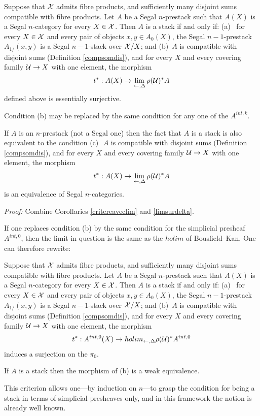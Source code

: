 \begin{proposition}
\label{critere7}
Suppose that ${\cal X}$ admits fibre products, and sufficiently many
\linebreak
disjoint sums compatible with fibre products. Let $A$ be a
Segal $n$-prestack
such that $A(X)$ is a Segal $n$-category for every $X\in {\cal X}$.
Then $A$ is a stack if and only if:
\newline
(a) \,  for every $X\in {\cal X}$ and every pair of objects $x,y\in A_0(X)$, the
Segal $n-1$-prestack $A_{1/}(x,y)$ is a Segal $n-1$-stack over
${\cal X} /X$;
and
\newline
(b)\, $A$ is compatible with disjoint sums (Definition
\ref{compsomdis}), and for every $X$ and every covering family ${\cal U} \rightarrow
X$ with one element, the morphism
$$
t^{\ast} : A(X) \rightarrow \lim _{\leftarrow , \Delta} \rho ({\cal U} )^{\ast }A
$$
defined above is essentially surjective.

Condition (b) may be
replaced by the same condition for any one of the
$A^{int, k}$.

If $A$ is an $n$-prestack (not a Segal one) then
the fact that $A$ is a stack is also equivalent to the condition
\newline
(c)\,\,  $A$ is compatible with disjoint sums (Definition
\ref{compsomdis}), and for every $X$ and every covering family ${\cal U}
\rightarrow
X$ with one element, the
morphism
$$
t^{\ast} : A(X) \rightarrow \lim _{\leftarrow , \Delta} \rho ({\cal U} )^{\ast }A
$$
is an equivalence of Segal $n$-categories.
\end{proposition}
{\em Proof:}
Combine Corollaries \ref{critereaveclim} and \ref{limsurdelta}.
\eop

If one replaces condition (b) by the same condition for the simplicial
presheaf $A^{int, 0}$, then the limit
in question is the same as the $holim$ of Bousfield--Kan. One
can therefore rewrite:
\begin{corollary}
Suppose that ${\cal X}$ admits fibre products, and sufficiently many disjoint sums
compatible with fibre products. Let $A$ be a Segal $n$-prestack such that
$A(X)$ is a Segal $n$-category
for every $X\in {\cal X}$. Then $A$ is a stack if and only if:
\newline
(a) \,  for every $X\in {\cal X}$ and every pair of objects $x,y\in A_0(X)$, the
Segal $n-1$-prestack $A_{1/}(x,y)$ is a Segal $n-1$-stack over
${\cal X} /X$; and
\newline
(b)\, $A$ is compatible with disjoint sums (Definition
\ref{compsomdis}), and for every $X$ and every covering family ${\cal U} \rightarrow
X$ with one element, the morphism
$$
t^{\ast} : A^{int, 0}(X) \rightarrow holim _{\leftarrow , \Delta} \rho
({\cal U} )^{\ast }A^{int ,0}
$$
induces a surjection on the $\pi _0$.

If $A$ is a stack then the morphism of (b) is a weak equivalence.
\end{corollary}
\eop

This criterion allows one---by induction on $n$---to grasp the condition for
being a stack in terms of simplicial presheaves only, and in this framework the
notion is already well known.

